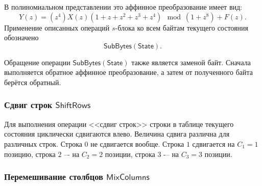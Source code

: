 В полиномиальном представлении это аффинное преобразование имеет вид:
\[Y(z)=(z^4)X(z)(1+z+z^2+z^3+z^4)\mod(1+z^8) + F(z).\]
Применение описанных операций $s$-блока ко всем байтам текущего состояния обозначено
    \[ \mathsf{SubBytes(State)}. \]

Обращение операции $\mathsf{SubBytes(State)}$ также является заменой байт. Сначала выполняется обратное аффинное преобразование, а затем от полученного байта берётся обратный.


\subsubsection{Сдвиг строк $\mathsf{ShiftRows}$}

Для выполнения операции <<сдвиг строк>> строки в таблице текущего состояния циклически сдвигаются влево. Величина сдвига различна для различных строк. Строка $0$ не сдвигается вообще. Строка $1$ сдвигается на $C_1=1$ позицию, строка $2$ –- на $C_2=2$ позиции, строка $3$ -– на $C_3=3$ позиции.
%


\subsubsection{Перемешивание столбцов $\mathsf{Mix Columns}$}

